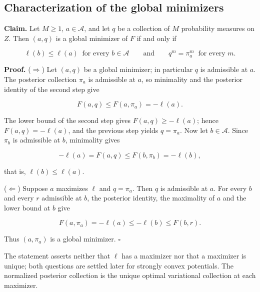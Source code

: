 \documentclass[11pt,a4paper]{report}
\begin{document}
\subsection{\texorpdfstring{Characterization of the global minimizers}{Characterization of the global minimizers}}


\textbf{Claim.} Let \(M\ge1\), \(a\in\mathcal A\), and let \(q\) be a collection of \(M\) probability measures on \(Z\). Then \((a,q)\) is a global minimizer of \(F\) if and only if


\[\ell(b)\le\ell(a)\ \text{ for every }b\in\mathcal A\qquad\text{and}\qquad q^m=\pi_a^m\ \text{ for every }m.\]


\textbf{Proof.} (\(\Rightarrow\)) Let \((a,q)\) be a global minimizer; in particular \(q\) is admissible at \(a\). The posterior collection \(\pi_a\) is admissible at \(a\), so minimality and the posterior identity of the second step give


\[F(a,q)\le F(a,\pi_a)=-\ell(a).\]


The lower bound of the second step gives \(F(a,q)\ge-\ell(a)\); hence \(F(a,q)=-\ell(a)\), and the previous step yields \(q=\pi_a\). Now let \(b\in\mathcal A\). Since \(\pi_b\) is admissible at \(b\), minimality gives


\[-\ell(a)=F(a,q)\le F(b,\pi_b)=-\ell(b),\]


that is, \(\ell(b)\le\ell(a)\).




(\(\Leftarrow\)) Suppose \(a\) maximizes \(\ell\) and \(q=\pi_a\). Then \(q\) is admissible at \(a\). For every \(b\) and every \(r\) admissible at \(b\), the posterior identity, the maximality of \(a\) and the lower bound at \(b\) give


\[F(a,\pi_a)=-\ell(a)\le-\ell(b)\le F(b,r).\]


Thus \((a,\pi_a)\) is a global minimizer. \(\square\)




The statement asserts neither that \(\ell\) has a maximizer nor that a maximizer is unique; both questions are settled later for strongly convex potentials. The normalized posterior collection is the unique optimal variational collection at each maximizer.
\end{document}

